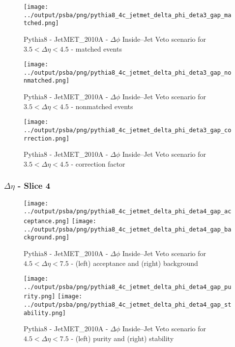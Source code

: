 \documentclass[11pt]{book}
\begin{document}
\begin{figure}[ht]
\centering
\texttt{[image: ../output/psba/png/pythia8\_4c\_jetmet\_delta\_phi\_deta3\_gap\_matched.png]}
\caption{Pythia8 - JetMET\_2010A - $\Delta\phi$ Inside--Jet Veto scenario for $3.5 < \Delta\eta < 4.5$ - matched events}
\label{fig:p8_jetmet_delta_phi_deta3_gap_matched}
\end{figure}

\begin{figure}[ht]
\centering
\texttt{[image: ../output/psba/png/pythia8\_4c\_jetmet\_delta\_phi\_deta3\_gap\_nonmatched.png]}
\caption{Pythia8 - JetMET\_2010A - $\Delta\phi$ Inside--Jet Veto scenario for $3.5 < \Delta\eta < 4.5$ - nonmatched events}
\label{fig:p8_jetmet_delta_phi_deta3_gap_nonmatched}
\end{figure}

\begin{figure}[ht]
\centering
\texttt{[image: ../output/psba/png/pythia8\_4c\_jetmet\_delta\_phi\_deta3\_gap\_correction.png]}
\caption{Pythia8 - JetMET\_2010A - $\Delta\phi$ Inside--Jet Veto scenario for $3.5 < \Delta\eta < 4.5$ - correction factor}
\label{fig:p8_jetmet_delta_phi_deta3_gap_correction}
\end{figure}



\clearpage
\subsubsection{$\Delta\eta$ - Slice 4}
\begin{figure}[ht]
\centering
\texttt{[image: ../output/psba/png/pythia8\_4c\_jetmet\_delta\_phi\_deta4\_gap\_acceptance.png]}
\texttt{[image: ../output/psba/png/pythia8\_4c\_jetmet\_delta\_phi\_deta4\_gap\_background.png]}
\caption{Pythia8 - JetMET\_2010A - $\Delta\phi$ Inside--Jet Veto scenario for $4.5 < \Delta\eta < 7.5$ - (left) acceptance and (right) background}
\label{fig:p8_jetmet_delta_phi_deta4_gap_ab}
\end{figure}

\begin{figure}[ht]
\centering
\texttt{[image: ../output/psba/png/pythia8\_4c\_jetmet\_delta\_phi\_deta4\_gap\_purity.png]}
\texttt{[image: ../output/psba/png/pythia8\_4c\_jetmet\_delta\_phi\_deta4\_gap\_stability.png]}
\caption{Pythia8 - JetMET\_2010A - $\Delta\phi$ Inside--Jet Veto scenario for $4.5 < \Delta\eta < 7.5$ - (left) purity and (right) stability}
\label{fig:p8_jetmet_delta_phi_deta4_gap_ps}
\end{figure}
\end{document}
